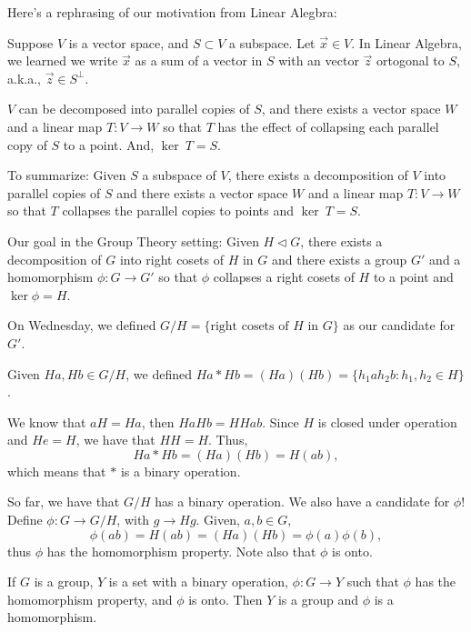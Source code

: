 
Here's a rephrasing of our motivation from Linear Alegbra:

Suppose $V$ is a vector space, and $S \subset V$ a subspace. Let $\vec{x} \in V$. In Linear Algebra, we learned we write $\vec{x}$ as a sum of a vector in $S$ with an vector $\vec{z}$ ortogonal to $S$, a.k.a., $\vec{z} \in S^\perp$. 

$V$ can be decomposed into parallel copies of $S$, and there exists a vector space $W$ and a linear map $T: V \to W$ so that  $T$ has the effect of collapsing each parallel copy of $S$ to a point. And, $\ker\ T = S$.

To summarize: Given $S$ a subspace of $V$, there exists a decomposition of  $V$ into parallel copies of $S$ and there exists a vector space $W$ and a linear map $T : V \to W$ so that  $T$ collapses the parallel copies to points and $\ker\ T = S$.

Our goal in the Group Theory setting: Given  $H \vartriangleleft G$, there exists a decomposition of  $G$ into right cosets of $H$ in $G$ and there exists a group $G'$ and a homomorphism $\phi: G \to G'$ so that $\phi$ collapses a right cosets of $H$ to a point and  $\ker \phi = H$.

On Wednesday, we defined $G/H = \{\text{right cosets of $H$ in $G$}\}$ as our candidate for $G'$.

Given  $Ha, Hb \in G/H$, we defined  $Ha * Hb = (Ha)(Hb) = \{h_1ah_2b : h_1, h_2 \in H\}$.

We know that $aH = Ha$, then $HaHb = HHab$. Since $H$ is closed under operation and $He = H$, we have that $HH = H$. Thus, \[Ha * Hb = (Ha)(Hb) = H(ab),\]
which means that $*$ is a binary operation. 

So far, we have that $G/H$ has a binary operation. We also have a candidate for  $\phi$! Define $\phi: G \to G/H$, with  $g \to Hg$. Given,  $a, b \in G$, \[\phi(ab) = H(ab) = (Ha)(Hb) = \phi(a)\phi(b), \] thus $\phi$ has the homomorphism property. Note also that $\phi$ is onto.

\begin{lem}
	If $G$ is a group, $Y$ is a set with a binary operation, $\phi : G \to Y$ such that $\phi$ has the homomorphism property, and $\phi$ is onto. Then $Y$ is a group and $\phi$ is a homomorphism.
\end{lem}

